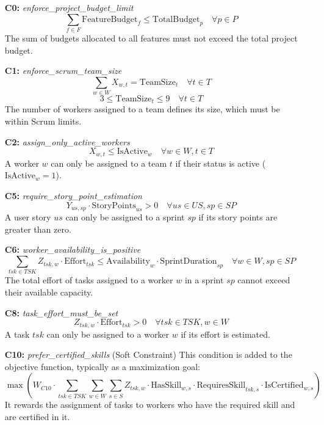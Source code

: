 \documentclass[a4paper, 11pt]{article}
\begin{document}
\begin{itemize}
    \item[\textbf{C0:}] \textit{enforce\_project\_budget\_limit}
    $$ \sum_{f \in F} \text{FeatureBudget}_f \le \text{TotalBudget}_p \quad \forall p \in P $$
    The sum of budgets allocated to all features must not exceed the total project budget.

    \item[\textbf{C1:}] \textit{enforce\_scrum\_team\_size}
    $$ \sum_{w \in W} X_{w,t} = \text{TeamSize}_{t} \quad \forall t \in T $$
    $$ 3 \le \text{TeamSize}_{t} \le 9 \quad \forall t \in T $$
    The number of workers assigned to a team defines its size, which must be within Scrum limits.

    \item[\textbf{C2:}] \textit{assign\_only\_active\_workers}
    $$ X_{w,t} \le \text{IsActive}_w \quad \forall w \in W, t \in T $$
    A worker $w$ can only be assigned to a team $t$ if their status is active ($\text{IsActive}_w = 1$).

    \item[\textbf{C5:}] \textit{require\_story\_point\_estimation}
    $$ Y_{us,sp} \cdot \text{StoryPoints}_{us} > 0 \quad \forall us \in US, sp \in SP $$
    A user story $us$ can only be assigned to a sprint $sp$ if its story points are greater than zero.

    \item[\textbf{C6:}] \textit{worker\_availability\_is\_positive}
    $$ \sum_{tsk \in TSK} Z_{tsk,w} \cdot \text{Effort}_{tsk} \le \text{Availability}_w \cdot \text{SprintDuration}_{sp} \quad \forall w \in W, sp \in SP $$
    The total effort of tasks assigned to a worker $w$ in a sprint $sp$ cannot exceed their available capacity.

    \item[\textbf{C8:}] \textit{task\_effort\_must\_be\_set}
    $$ Z_{tsk,w} \cdot \text{Effort}_{tsk} > 0 \quad \forall tsk \in TSK, w \in W $$
    A task $tsk$ can only be assigned to a worker $w$ if its effort is estimated.

    \item[\textbf{C10:}] \textit{prefer\_certified\_skills} (Soft Constraint)
    This condition is added to the objective function, typically as a maximization goal:
    $$ \max \left( W_{C10} \cdot \sum_{tsk \in TSK} \sum_{w \in W} \sum_{s \in S} Z_{tsk,w} \cdot \text{HasSkill}_{w,s} \cdot \text{RequiresSkill}_{tsk,s} \cdot \text{IsCertified}_{w,s} \right) $$
    It rewards the assignment of tasks to workers who have the required skill and are certified in it.
\end{itemize}
\end{document}
